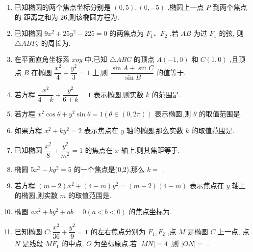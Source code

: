 \begin{enumerate}


    \item 已知椭圆的两个焦点坐标分别是 $\left( {0,5}\right) ,\left( {0, - 5}\right)$ ,椭圆上一点 $P$ 到两个焦点的 距离之和为 26,则该椭圆方程为.

    \item 已知椭圆 $9{x}^{2} + {25}{y}^{2} - {225} = 0$ 的两焦点为 ${F}_{1}\text{、}{F}_{2}$ ,若 ${AB}$ 为过 ${F}_{1}$ 的弦, 则 $\bigtriangleup  {AB}{F}_{2}$ 的周长为.

    \item 在平面直角坐标系 ${xoy}$ 中,已知 $\bigtriangleup {ABC}$ 的顶点 $A\left( {-1,0}\right)$ 和 $C\left( {1,0}\right)$ ,且顶点 $B$ 在椭圆 $\dfrac{{x}^{2}}{4} + \dfrac{{y}^{2}}{3} = 1$ 上,则 $\dfrac{\sin A + \sin C}{\sin B}$ 的值等于. 
    
    \item 若方程 $\dfrac{{x}^{2}}{4 - k} + \dfrac{{y}^{2}}{6 + k} = 1$ 表示椭圆,则实数 $k$ 的范围是. 
    
    \item 若方程 ${x}^{2}\cos \theta  + {y}^{2}\sin \theta  = 1\left( {\theta  \in  \left( {0,{2\pi }}\right) }\right)$ 表示椭圆,则 $\theta$ 的取值范围是. 
    
    \item 如果方程 ${x}^{2} + k{y}^{2} = 2$ 表示焦点在 $y$ 轴的椭圆,那么实数 $k$ 的取值范围是. 
    
    \item 已知椭圆 $\dfrac{{x}^{2}}{8} + \dfrac{{y}^{2}}{{m}^{2}} = 1$ 的焦点在 ${x}$ 轴上,则其焦距等于. 
    
    
    \item 椭圆 $5{x}^{2} - k{y}^{2} = 5$ 的一个焦点是(0,2),那么 $k =$ . 
    
    \item 若方程 $\left( {m - 2}\right) {x}^{2} + \left( {4 - m}\right) {y}^{2} = \left( {m - 2}\right) \left( {4 - m}\right)$ 表示焦点在 $y$ 轴上的椭圆,则实数 $m$ 的取值范围是.

    \item 椭圆 $a{x}^{2} + b{y}^{2} + {ab} = 0\left( {a < b < 0}\right)$ 的焦点坐标为.

    \item 已知椭圆 $C : \dfrac{{x}^{2}}{36} + \dfrac{{y}^{2}}{9} = 1$ 的左右焦点分别为 ${F}_{1},{F}_{2}$ ,点 $M$ 是椭圆 $C$ 上一点, 点 $N$ 是线段 $M{F}_{1}$ 的中点, $O$ 为坐标原点,若 $\left| {MN}\right|  = 4$ ,则 $\left| {ON}\right|  =$ .


\end{enumerate}
